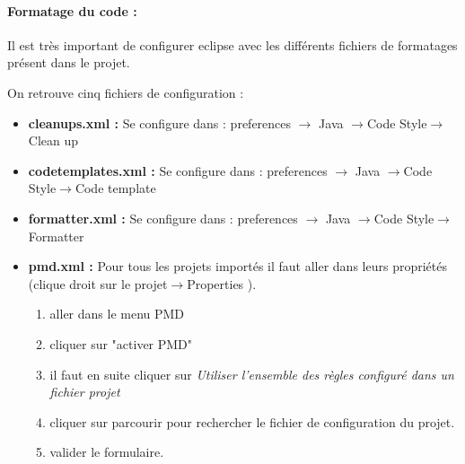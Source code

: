 \paragraph{Formatage du code :}
Il est très important de configurer eclipse avec les différents fichiers de formatages
présent dans le projet. 

On retrouve cinq fichiers de configuration :
\begin{itemize}
	\item  \textbf{cleanups.xml :}  Se configure dans :
				  preferences $\rightarrow$ Java $\rightarrow$Code Style$\rightarrow$Clean up

	\item \textbf{codetemplates.xml :}  Se configure dans :
				 preferences $\rightarrow$ Java $\rightarrow$Code Style$\rightarrow$Code template

	\item \textbf{formatter.xml :} Se configure dans :
				 preferences $\rightarrow$ Java $\rightarrow$Code Style$\rightarrow$Formatter

	\item  \textbf{pmd.xml :} Pour tous les projets importés il faut aller dans leurs propriétés  
		(clique droit sur le projet$\rightarrow$Properties ).
		\begin{enumerate}
			\item aller dans le menu PMD
			\item cliquer sur "activer PMD"
			\item il faut en suite cliquer sur \emph{Utiliser l'ensemble des règles configuré dans un fichier projet}
			\item cliquer sur parcourir pour rechercher le fichier de configuration du projet.
			\item valider le formulaire.
		\end{enumerate}



\end{itemize}
